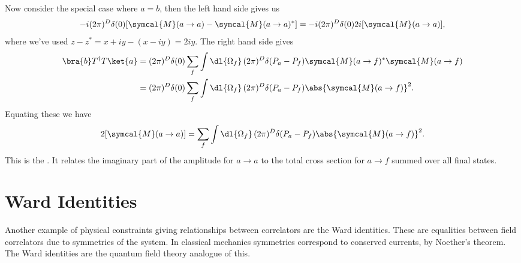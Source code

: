 \documentclass[fleqn]{NotesClass}
\newcommand{\hermit}{{\dagger}}
\let\Im\relax
\DeclareMathOperator{\Im}{Im}
\newcommand{\amplitude}{\symcal{M}}
\begin{document}
    Now consider the special case where \(a = b\), then the left hand side gives us
    \begin{equation}
        -i(2\pi)^D \delta(0) [\amplitude(a \to a) - \amplitude(a \to a)^*] = -i(2\pi)^D \delta(0) 2i\Im[\amplitude(a \to a)],
    \end{equation}
    where we've used \(z - z^* = x + iy - (x - iy) = 2iy\).
    The right hand side gives
    \begin{align}
        \bra{b} T^\hermit T\ket{a} &= (2\pi)^D \delta(0) \sum_f \int \dl{\Omega_f} \, (2\pi)^D \delta(P_a - P_f) \amplitude(a \to f)^* \amplitude(a \to f) \notag\\
        &= (2\pi)^D \delta(0) \sum_f \int \dl{\Omega_f} \, (2\pi)^D \delta(P_a - P_f) \abs{\amplitude(a \to f)}^2.
    \end{align}
    Equating these we have
    \begin{equation}
        2\Im[\amplitude(a \to a)] = \sum_f \int \dl{\Omega_f} \, (2\pi)^D \delta(P_a - P_f) \abs{\amplitude(a \to f)}^2.
    \end{equation}
    This is the .
    It relates the imaginary part of the amplitude for \(a \to a\) to the total cross section for \(a \to f\) summed over all final states.
    
    \section{Ward Identities}
    Another example of physical constraints giving relationships between correlators are the Ward identities.
    These are equalities between field correlators due to symmetries of the system.
    In classical mechanics symmetries correspond to conserved currents, by Noether's theorem.
    The Ward identities are the quantum field theory analogue of this.
    
\end{document}
